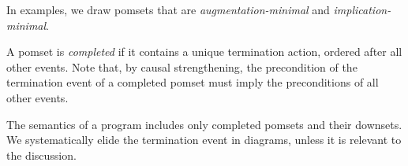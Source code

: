 
In examples, we draw pomsets that are \emph{augmentation\hyp{}minimal} and
\emph{implication\hyp{}minimal}.

A pomset is \emph{completed} if it contains a unique termination action,
ordered after all other events.  Note that, by causal strengthening, the
precondition of the termination event of a completed pomset must imply the
preconditions of all other events.

The semantics of a program includes only completed pomsets and their
downsets.  We systematically elide the termination event in diagrams, unless
it is relevant to the discussion.


